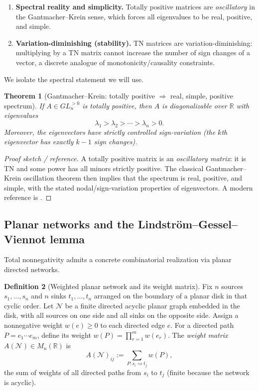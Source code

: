\documentclass[11pt,oneside]{amsbook}
\numberwithin{equation}{section}
\theoremstyle{plain}
\newtheorem{theorem}{Theorem}[section]
\theoremstyle{definition}
\newtheorem{definition}[theorem]{Definition}
\theoremstyle{remark}
\newcommand{\R}{\mathbb{R}}
\begin{document}
\begin{enumerate}[label=(\roman*)]
\item \textbf{Spectral reality and simplicity.}
Totally positive matrices are \emph{oscillatory} in the Gantmacher--Krein sense, which forces all eigenvalues to be real, positive, and simple.
\item \textbf{Variation-diminishing (stability).}
TN matrices are variation-diminishing: multiplying by a TN matrix cannot increase the number of sign changes of a vector, a discrete analogue of monotonicity/causality constraints.
\end{enumerate}

We isolate the spectral statement we will use.

\begin{theorem}[Gantmacher--Krein: totally positive $\Rightarrow$ real, simple, positive spectrum]
\label{thm:tp_real_spectrum}
If $A\in GL_n^{>0}$ is totally positive, then $A$ is diagonalizable over $\R$ with eigenvalues
\[
\lambda_1>\lambda_2>\cdots>\lambda_n>0.
\]
Moreover, the eigenvectors have strictly controlled sign-variation (the $k$th eigenvector has exactly $k-1$ sign changes).
\end{theorem}

\begin{proof}[Proof sketch / reference]
A totally positive matrix is an \emph{oscillatory matrix}: it is TN and some power has all minors strictly positive.
The classical Gantmacher--Krein oscillation theorem then implies that the spectrum is real, positive, and simple, with the stated nodal/sign-variation properties of eigenvectors.
A modern reference is \cite[Thm.\ 2.5 and surrounding discussion]{Pinkus1996TotallyPositive}.
\end{proof}

\subsection{Planar networks and the Lindstr\"om--Gessel--Viennot lemma}

Total nonnegativity admits a concrete combinatorial realization via planar directed networks.

\begin{definition}[Weighted planar network and its weight matrix]
Fix $n$ sources $s_1,\dots,s_n$ and $n$ sinks $t_1,\dots,t_n$ arranged on the boundary of a planar disk in that cyclic order.
Let $\mathcal{N}$ be a finite directed acyclic planar graph embedded in the disk, with all sources on one side and all sinks on the opposite side.
Assign a nonnegative weight $w(e)\ge 0$ to each directed edge $e$.
For a directed path $P=e_1\cdots e_m$, define its weight $w(P)=\prod_{r=1}^m w(e_r)$.
The \emph{weight matrix} $A(\mathcal{N})\in M_n(\R)$ is
\[
A(\mathcal{N})_{ij}:=\sum_{P:s_i\rightsquigarrow t_j} w(P),
\]
the sum of weights of all directed paths from $s_i$ to $t_j$ (finite because the network is acyclic).
\end{definition}
\end{document}
